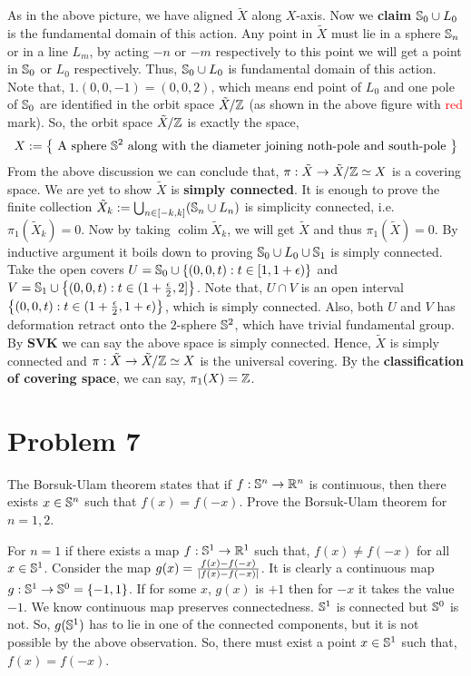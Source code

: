\documentclass[11pt]{article}
\begin{document}
\noindent As in the above picture, we have aligned $\tilde{X}$ along $X$-axis. Now we \textbf{claim} $\mathbb{S}_0 \cup L_0$ is the fundamental domain of this action. Any point in $\tilde{X}$ must lie in a sphere $\mathbb{S}_n$ or in a line $L_m$, by acting $-n$ or $-m$ respectively to this point we will get a point in $\mathbb{S}_0$ or $L_0$ respectively. Thus, $\mathbb{S}_0\cup L_0$ is fundamental domain of this action. Note that, $1.(0,0,-1) = (0,0,2)$, which means end point of $L_0$ and one pole of $\mathbb{S}_0$ are identified in the orbit space $\tilde{X}/\mathbb{Z}$ (as shown in the above figure with \textcolor{red}{red} mark). So, the orbit space $\tilde{X}/\mathbb{Z}$ is exactly the space, $$X := \qty{\text{ A sphere } \mathbb{S}^2 \text{ along with the diameter joining noth-pole and south-pole }}$$
From the above discussion we can conclude that, $\pi : \tilde{X} \to \tilde{X}/\mathbb{Z} \simeq X$ is a covering space. We are yet to show $\tilde{X}$ is \textbf{simply connected}. It is enough to prove the finite collection $\tilde{X}_k := \bigcup_{n \in [-k,k]} (\mathbb{S}_n\cup L_n)$ is simplicity connected, i.e. $\pi_1(\tilde{X}_k) = \qty{0}$. Now by taking $\operatorname{colim} \tilde{X}_k$, we will get $\tilde{X}$ and thus $\pi_1(\tilde{X})=\qty{0}$. By inductive argument it boils down to proving $\mathbb{S}_0 \cup L_0 \cup \mathbb{S}_1$ is simply connected. Take the open covers $U = \mathbb{S}_0 \cup \qty{(0,0,t) :t \in [1,1+\epsilon)}$ and $V = \mathbb{S}_1 \cup \qty{(0,0,t) : t \in (1+\frac{\epsilon}{2},2]}$. Note that, $U\cap V$ is an open interval $\qty{(0,0,t): t \in (1+\frac{\epsilon}{2},1+\epsilon)}$, which is simply connected. Also, both $U$ and  $V$ has deformation retract onto the $2$-sphere $\mathbb{S}^2$, which have trivial fundamental group. By \textbf{\textsf{SVK}} we can say the above space is simply connected. Hence, $\tilde{X}$ is simply connected and $\pi : \tilde{X} \to \tilde{X}/\mathbb{Z} \simeq X$ is the universal covering. By the \textbf{\textsf{classification of covering space}}, we can say, $\pi_1(X) = \mathbb{Z}$.


 \section{Problem 7}
 \begin{prob}{}
    The Borsuk-Ulam theorem states that if $f : \mathbb{S}^n \to \mathbb{R}^n$ is continuous, then there exists $x \in \mathbb{S}^n$ such that $f(x) = f(-x)$. Prove the Borsuk-Ulam theorem for $n=1,2$. 
 \end{prob}
 \sol For $n=1$ if there exists a map $f : \mathbb{S}^1 \to \mathbb{R}^1$ such that, $f(x) \neq f(-x)$ for all $x\in \mathbb{S}^1$. Consider the map $g(x) = \frac{f(x)-f(-x)}{\abs{f(x)-f(-x)}}$. It is clearly a continuous map $g : \mathbb{S}^1 \to \mathbb{S}^0=\qty{-1,1}$. If for some $x$, $g(x)$ is $+1$ then for $-x$ it takes the value $-1$. We know continuous map preserves connectedness. $\mathbb{S}^1$ is connected but $\mathbb{S}^0$ is not. So, $g(\mathbb{S}^1)$ has to lie in one of the connected components, but it is not possible by the above observation. So, there must exist a point $x \in \mathbb{S}^1$ such that, $f(x)=f(-x)$. 
 
\end{document}
